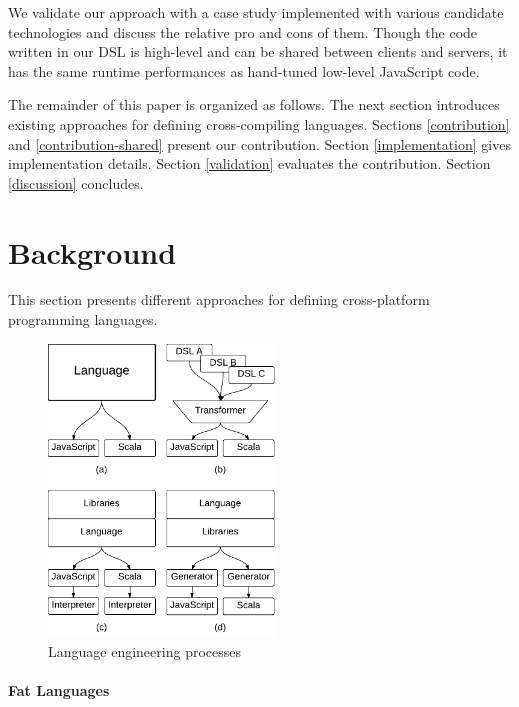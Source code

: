 \documentclass[preprint]{sigplanconf}
\begin{document}
We validate our approach with a case study implemented with various candidate technologies and discuss the relative
pro and cons of them. Though the code written in our DSL is high-level and can be shared between clients and servers,
it has the same runtime performances as hand-tuned low-level JavaScript code.

The remainder of this paper is organized as follows. The next section introduces existing approaches for defining
cross-compiling languages. Sections \ref{contribution} and \ref{contribution-shared} present our contribution.
Section \ref{implementation} gives implementation details. Section \ref{validation} evaluates the contribution.
Section \ref{discussion} concludes.

\section{Background}

This section presents different approaches for defining cross-platform programming languages.

\begin{figure}
\begin{center}
\includegraphics[width=6cm]{langs.pdf}
\end{center}
\caption{Language engineering processes}
\label{langs}
\end{figure}

\paragraph{Fat Languages}
\end{document}
